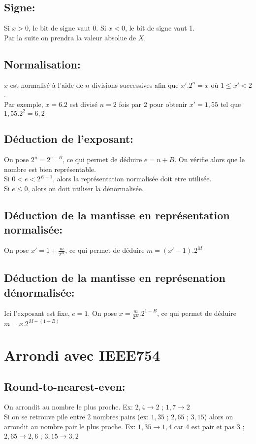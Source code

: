 \documentclass[11pt]{article}
\begin{document}
\subsection{Signe:}
Si $x > 0$, le bit de signe vaut 0. Si $x < 0$, le bit de signe vaut 1. \\
Par la suite on prendra la valeur absolue de $X$.

\subsection{Normalisation:}
$x$ est normalisé à l’aide de $n$ divisions successives afin que $x'.2^n=x$ où $1 \leq x' <2$. \\
Par exemple, $x=6.2$ est divisé $n=2$ fois par $2$ pour obtenir $x'=1,55$ tel que $1,55.2^2=6,2$

\subsection{Déduction de l'exposant:}
On pose $2^n=2^{e-B}$, ce qui permet de déduire $e=n+B$. On vérifie alors que le nombre est bien représentable. \\
Si $0<e<2^{E-1}$, alors la représentation normalisée doit etre utilisée. \\
Si $e \leq 0$, alors on doit utiliser la dénormalisée.

\subsection{Déduction de la mantisse en représentation normalisée:}
On pose $x'=1+\frac{m}{2^M}$, ce qui permet de déduire $m=(x'-1).2^M$

\subsection{Déduction de la mantisse en représenation dénormalisée:}
Ici l'exposant est fixe, $e=1$. On pose $x=\frac{m}{2^M}.2^{1-B}$, ce qui permet de déduire $m=x.2^{M-(1-B)}$

\newpage

\section{Arrondi avec IEEE754}

\subsection{Round-to-nearest-even:}
On arrondit au nombre le plus proche. Ex: $2,4 \rightarrow 2$ ; $1,7 \rightarrow 2$ \\
Si on se retrouve pile entre 2 nombres pairs (ex: $1,35$ ; $2,65$ ; $3,15$) alors on arrondit au nombre pair le plus proche. Ex: $1,35 \rightarrow 1,4$ car $4$ est pair et pas $3$ ; 
$2,65 \rightarrow 2,6$ ; $3,15 \rightarrow 3,2$
\end{document}
